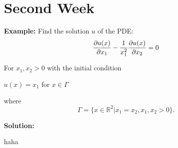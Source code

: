 
\section{Second Week}


\textbf{Example:} Find the solution $u$ of the PDE: $$ \frac{\partial u(x)}{\partial x_1} - \frac{1}{x_1^2}\frac{\partial u(x)}{\partial x_2} = 0 $$

For $x_1, x_2 > 0$ with the initial condition
\begin{center}
	$u(x) = x_1$ for  $x \in \Gamma$
\end{center}

where $$\Gamma = \{x \in \mathbb{R}^2 | x_1 = x_2, x_1, x_2 > 0\}.$$

\textbf{Solution:}

haha
